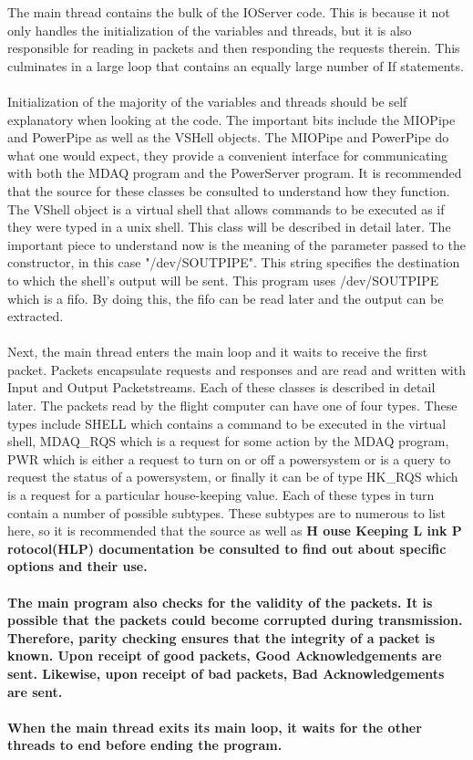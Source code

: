 The main thread contains the bulk of the IOServer code. This is because it not only handles the 
initialization of the variables and threads, but it is also responsible for reading in packets
and then responding the requests therein. This culminates in a large loop that contains an equally
large number of If statements. \\
\\
Initialization of the majority of the variables and threads should be self explanatory when looking
at the code. The important bits include the MIOPipe and PowerPipe as well as the VSHell objects. The
MIOPipe and PowerPipe do what one would expect, they provide a convenient interface for communicating
with both the MDAQ program and the PowerServer program. It is recommended that the source for these
classes be consulted to understand how they function. The VShell object is a virtual shell that allows
commands to be executed as if they were typed in a unix shell. This class will be described in detail later.
The important piece to understand now is the meaning of the parameter passed to the constructor, in this
case "/dev/SOUTPIPE". This string specifies the destination to which the shell's output will be sent. 
This program uses /dev/SOUTPIPE which is a fifo. By doing this, the fifo can be read later and the output
can be extracted.\\
\\
Next, the main thread enters the main loop and it waits to receive the first packet. Packets encapsulate
requests and responses and are read and written with Input and Output Packetstreams. Each of these classes
is described in detail later. The packets read by the flight computer can have one of four types. These 
types include SHELL which contains a command to be executed in the virtual shell, MDAQ\_RQS which is a request
for some action by the MDAQ program, PWR which is either a request to turn on or off a powersystem or is a
query to request the status of a powersystem, or finally it can be of type HK\_RQS which is a request for a
particular house-keeping value. Each of these types in turn contain a number of possible subtypes. These subtypes
are to numerous to list here, so it is recommended that the source as well as \bf H \rm ouse Keeping \bf L \rm ink
\bf P \rm rotocol(HLP) documentation be consulted to find out about specific options and their use. \\
\\
The main program also checks for the validity of the packets. It is possible that the packets could become corrupted
during transmission. Therefore, parity checking ensures that the integrity of a packet is known. Upon receipt of 
good packets, Good Acknowledgements are sent. Likewise, upon receipt of bad packets, Bad Acknowledgements are sent.\\
\\
When the main thread exits its main loop, it waits for the other threads to end before ending the program.

